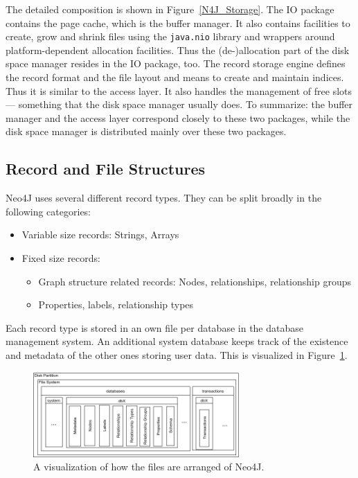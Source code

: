         The detailed composition is shown in Figure~\ref{N4J_Storage}.
        The IO package contains the page cache, which is the buffer manager.
        It also contains facilities to create, grow and shrink files using the \texttt{java.nio} library and wrappers around platform-dependent allocation facilities.
        Thus the (de-)allocation part of the disk space manager resides in the IO package, too.
        The record storage engine defines the record format and the file layout and means to create and maintain indices. Thus it is similar to the access layer. 
        It also handles the management of free slots --- something that the disk space manager usually does.
        To summarize: the buffer manager and the access layer correspond closely to these two packages, while the disk space manager is distributed mainly over these two packages.        

    \subsection{Record and File Structures}\label{n4j-struct}
        Neo4J uses several different record types. They can be split broadly in the following categories:
        \begin{itemize}
            \item Variable size records: Strings, Arrays
            \item Fixed size records:
            \begin{itemize}
            \item Graph structure related records: Nodes, relationships, relationship groups
            \item Properties, labels, relationship types
            \end{itemize}
        \end{itemize}
        
        Each record type is stored in an own file per database in the database management system.
        An additional system database keeps track of the existence and metadata of the other ones storing user data.
        This is visualized in Figure~\ref{n4j-disk}.
        \begin{figure}[htp]
            \begin{center}
                \includegraphics[keepaspectratio,height=0.4\textheight,width=0.7\textwidth]{img/04-databases/N4J_disk_view.png}
            \end{center}
            \caption{A visualization of how the files are arranged of Neo4J.}
            \label{n4j-disk}
        \end{figure}
        
